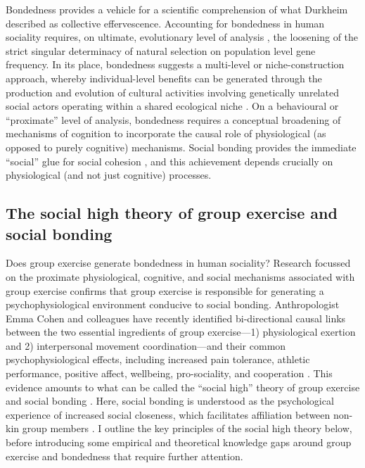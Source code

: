 \begin{CJK}{UTF8}{gbsn}
Bondedness provides a vehicle for a scientific comprehension of what Durkheim described as collective effervescence.  Accounting for bondedness in human sociality requires, on ultimate, evolutionary level of analysis \citep[cf.][]{Mayr1961,Tinbergen1963}, the loosening of the strict singular determinacy of natural selection on population level gene frequency.  In its place, bondedness suggests a multi-level or niche-construction approach, whereby individual-level benefits can be generated through the production and evolution of cultural activities involving genetically unrelated social actors operating within a shared ecological niche \citep{Dunbar2012,Laland2010,Laland2015}.  On a behavioural or ``proximate'' level of analysis, bondedness requires a conceptual broadening of mechanisms of cognition to incorporate the causal role of physiological (as opposed to purely cognitive) mechanisms.  Social bonding provides the immediate ``social'' glue for social cohesion \citep[cf.][]{Lakin2003,Bastian2014a}, and this achievement depends crucially on physiological (and not just cognitive) processes.

\subsection{The social high theory of group exercise and social bonding \label{sect:socialHigh}}

Does group exercise generate bondedness in human sociality?  Research focussed on the proximate physiological, cognitive, and social mechanisms associated with group exercise confirms that group exercise is responsible for generating a psychophysiological environment conducive to social bonding.  Anthropologist Emma Cohen and colleagues have recently identified bi-directional causal links between the two essential ingredients of group exercise---1) physiological exertion and 2) interpersonal movement coordination---and their common psychophysiological effects, including increased pain tolerance, athletic performance, positive affect, wellbeing, pro-sociality, and cooperation \citep{Davis2015}.  This evidence amounts to what can be called the ``social high'' theory of group exercise and social bonding \citep[hereafter ``the social high theory,'' see][]{Cohen2017}. Here, social bonding is understood as the psychological experience of increased social closeness, which facilitates affiliation between non-kin group members \citep{Tarr2014}.  I outline the key principles of the social high theory below, before introducing some empirical and theoretical knowledge gaps around group exercise and bondedness that require further attention.


\end{CJK}
